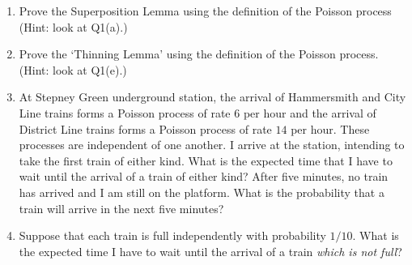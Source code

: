 \documentclass[11pt,a4paper]{article}
\begin{document}
\begin{enumerate}
        \begin{enumerate}
            \item Prove the Superposition Lemma using the definition of the Poisson process (Hint: look at Q1(a).)
            \item  Prove the ‘Thinning Lemma’ using the definition of the Poisson process. (Hint: look at Q1(e).)  
            \item At Stepney Green underground station, the arrival of Hammersmith and City Line trains forms a Poisson process of rate $6$ per hour and the arrival of District Line trains forms a Poisson process of rate $14$ per hour. These processes are independent of one another. I arrive at the station, intending to take the first train of either kind. What is the expected time that I have to wait until the arrival of a train of either kind? After five minutes, no train has arrived and I am still on the platform. What is the probability that a train will arrive in the next five minutes?
            \item Suppose that each train is full independently with probability $1/10$. What is the expected time I have to wait until the arrival of a train \textit{which is not full}?
        \end{enumerate} 
    \end{enumerate}
\end{document}
